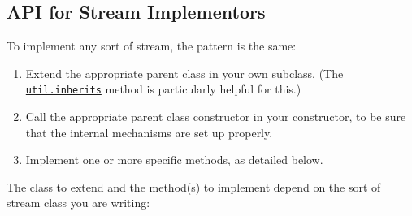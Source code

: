 \subsection{API for Stream
Implementors}\label{api-for-stream-implementors}

To implement any sort of stream, the pattern is the same:

\begin{enumerate}
\def\labelenumi{\arabic{enumi}.}
\itemsep1pt\parskip0pt
\item
  Extend the appropriate parent class in your own subclass. (The
  \href{util.html\#util_util_inherits_constructor_superconstructor}{\texttt{util.inherits}}
  method is particularly helpful for this.)
\item
  Call the appropriate parent class constructor in your constructor, to
  be sure that the internal mechanisms are set up properly.
\item
  Implement one or more specific methods, as detailed below.
\end{enumerate}

The class to extend and the method(s) to implement depend on the sort of
stream class you are writing:

\begin{Shaded}
\begin{Highlighting}[]
    \NormalTok{<}
\NormalTok{>}
\NormalTok{>}
\NormalTok{>}
\NormalTok{<}
\end{Highlighting}
\end{Shaded}

\begin{Shaded}
\begin{Highlighting}[]
\NormalTok{>}
\NormalTok{>}
  \NormalTok{>}
\NormalTok{<}
\end{Highlighting}
\end{Shaded}

\begin{Shaded}
\begin{Highlighting}[]
\NormalTok{>}
\NormalTok{>}
  \NormalTok{>}
\NormalTok{<}
\end{Highlighting}
\end{Shaded}

